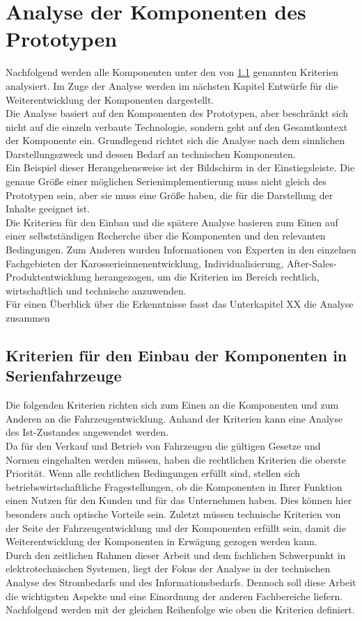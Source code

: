 \chapter{Analyse der Komponenten des Prototypen}
\label{cha:Analyse}
Nachfolgend werden alle Komponenten unter den von \ref{cha:Kriterien} genannten Kriterien analysiert. Im Zuge der Analyse werden im nächsten Kapitel Entwürfe für die Weiterentwicklung der Komponenten dargestellt.\\
Die Analyse basiert auf den Komponenten des Prototypen, aber beschränkt sich nicht auf die einzeln verbaute Technologie, sondern geht auf den Gesamtkontext der Komponente ein. Grundlegend richtet sich die Analyse nach dem sinnlichen Darstellungszweck und dessen Bedarf an technischen Komponenten. \\
Ein Beispiel dieser Herangehensweise ist der Bildschirm in der Einstiegsleiste. Die genaue Größe einer möglichen Serienimplementierung muss nicht gleich des Prototypen sein, aber sie muss eine Größe haben, die für die Darstellung der Inhalte geeignet ist.\\
Die Kriterien für den Einbau und die spätere Analyse basieren zum Einen auf einer selbstständigen Recherche über die Komponenten und den relevanten Bedingungen. Zum Anderen wurden Informationen von Experten in den einzelnen Fachgebieten der Karosserieinnenentwicklung, Individualisierung, After-Sales-Produktentwicklung herangezogen, um die Kriterien im Bereich rechtlich, wirtschaftlich und technische anzuwenden. \\
Für einen Überblick über die Erkenntnisse fasst das Unterkapitel XX die Analyse zusammen
\section{Kriterien für den Einbau der Komponenten in Serienfahrzeuge}
\label{cha:Kriterien}
Die folgenden Kriterien richten sich zum Einen an die Komponenten und zum Anderen an die Fahrzeugentwicklung. Anhand der Kriterien kann eine Analyse des Ist-Zustandes angewendet werden.\\
Da für den Verkauf und Betrieb von Fahrzeugen die gültigen Gesetze und Normen eingehalten werden müssen, haben die rechtlichen Kriterien die oberste Priorität. Wenn alle rechtlichen Bedingungen erfüllt sind, stellen sich betriebswirtschaftliche Fragestellungen, ob die Komponenten in Ihrer Funktion einen Nutzen für den Kunden und für das Unternehmen haben. Dies können hier besonders auch optische Vorteile sein. Zuletzt müssen technische Kriterien von der Seite der Fahrzeugentwicklung und der Komponenten erfüllt sein, damit die Weiterentwicklung der Komponenten in Erwägung gezogen werden kann. \\
Durch den zeitlichen Rahmen dieser Arbeit und dem fachlichen Schwerpunkt in elektrotechnischen Systemen, liegt der Fokus der Analyse in der technischen Analyse des Strombedarfs und des Informationsbedarfs. Dennoch soll diese Arbeit die wichtigsten Aspekte und eine Einordnung der anderen Fachbereiche liefern.\\
Nachfolgend werden mit der gleichen Reihenfolge wie oben die Kriterien definiert.
